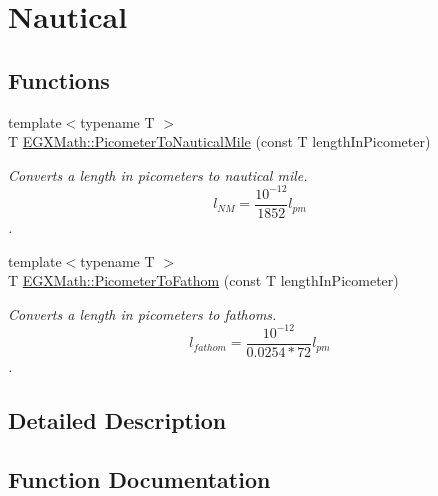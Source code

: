 \hypertarget{group___e_g_x_math-_conversions-_length_conversions-_s_i-_picometer-_nautical}{}\section{Nautical}
\label{group___e_g_x_math-_conversions-_length_conversions-_s_i-_picometer-_nautical}
\subsection*{Functions}
\begin{DoxyCompactItemize}
\item 
{\footnotesize template$<$typename T $>$ }\\T \mbox{\hyperlink{group___e_g_x_math-_conversions-_length_conversions-_s_i-_picometer-_nautical_ga7127ef6c7c68736b7a24d2c65b8ac858}{E\+G\+X\+Math\+::\+Picometer\+To\+Nautical\+Mile}} (const T length\+In\+Picometer)
\begin{DoxyCompactList}\small\item\em Converts a length in picometers to nautical mile. \[ l_{NM}= \frac{10^{-12}}{1852} l_{pm} \]. \end{DoxyCompactList}\item 
{\footnotesize template$<$typename T $>$ }\\T \mbox{\hyperlink{group___e_g_x_math-_conversions-_length_conversions-_s_i-_picometer-_nautical_ga1d8f092a0b6d47c4eaac5d9d19512d84}{E\+G\+X\+Math\+::\+Picometer\+To\+Fathom}} (const T length\+In\+Picometer)
\begin{DoxyCompactList}\small\item\em Converts a length in picometers to fathoms. \[ l_{fathom}= \frac{10^{-12}}{0.0254 * 72} l_{pm} \]. \end{DoxyCompactList}\end{DoxyCompactItemize}


\subsection{Detailed Description}


\subsection{Function Documentation}
\mbox{\label{group___e_g_x_math-_conversions-_length_conversions-_s_i-_picometer-_nautical_ga1d8f092a0b6d47c4eaac5d9d19512d84}} 
